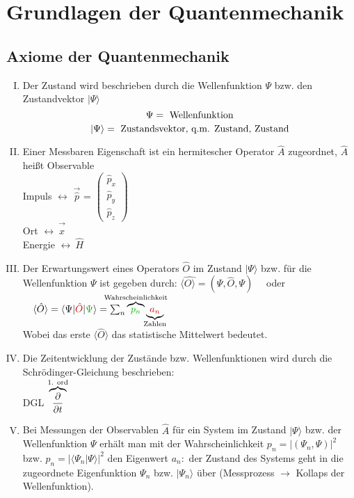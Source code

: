 
\chapter{Grundlagen der Quantenmechanik}


\section{Axiome der Quantenmechanik}

\begin{enumerate}[I)]
	\item Der Zustand wird beschrieben durch die Wellenfunktion $ \Psi $ bzw. den Zustandvektor $ |\Psi \rangle $\\
	$$ \Psi = \textrm{ Wellenfunktion}$$
	$$ \vert\Psi\rangle = \textrm{ Zustandsvektor, q.m. Zustand, Zustand}$$
	\item Einer Messbaren Eigenschaft ist ein hermitescher Operator $ \hat{A} $ zugeordnet, $ \hat{A} $ heißt Observable\\
	Impuls $\leftrightarrow$ $\vec{\hat p}$ = $\begin{pmatrix} \hat p_x \\ \hat p_y \\ \hat p_z \end{pmatrix}$\\
	Ort $\leftrightarrow\ \vec{\hat x}$\\
	Energie $\leftrightarrow\ \hat H$
	\item Der Erwartungswert eines Operators $ \hat{O} $ im Zustand $ |\Psi\rangle $ bzw. für die Wellenfunktion $ \Psi $ ist gegeben durch:
	 $ \langle \hat{ O \rangle} = (\Psi, \hat{O}, \Psi) \quad $ oder $ \quad \langle \hat O \rangle = \langle \Psi \vert \color{black!20!red}\hat O \color{black}\vert \color{black!30!green} \Psi \color{black}\rangle = \sum_n \overbrace{\color{black!30!green}p_n}^{\mathclap{\tx{Wahrscheinlichkeit}}} \underbrace{\color{black!20!red}a_n}_{\mathclap{\tx{Zahlen}}}$\\
	Wobei das erste $\langle \hat O \rangle$ das statistische Mittelwert bedeutet. \\
	\item Die Zeitentwicklung der Zustände bzw. Wellenfunktionen wird durch die Schrödinger-Gleichung beschrieben:\\
	DGL $\overbrace{\frac{\partial }{\partial t}}^{\textrm{1. ord}}$
	\item Bei Messungen der Observablen $ \hat{A} $ für ein System im Zustand $ |\Psi \rangle $ bzw. der Wellenfunktion $ \Psi $ erhält man mit der Wahrscheinlichkeit $ p_n = |(\Psi_n, \Psi)|^2 $ bzw. $ p_n = |\langle \Psi_n | \Psi \rangle |^2 $ den Eigenwert $ a_n : $ der Zustand des Systems geht in die zugeordnete Eigenfunktion $ \Psi_n $ bzw. $ |\Psi_n\rangle $ über (Messprozess $ \rightarrow $ Kollaps der Wellenfunktion).
\end{enumerate}

